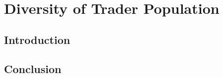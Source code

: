 %


\chapter{Diversity of Trader Population}
\label{chap:population}


\section{Introduction}



\section{Conclusion}
\label{sec:population:conclusion}


